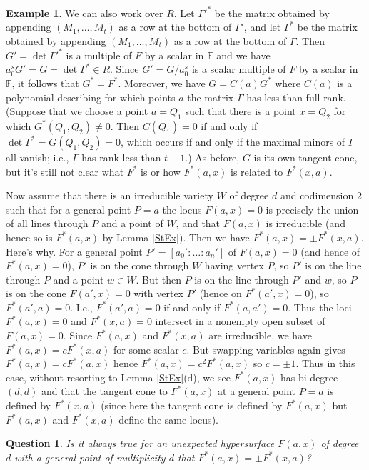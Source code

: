 \documentclass[12pt]{amsart}
\numberwithin{equation}{section}
\newtheorem{question}[theorem]{Question}
\theoremstyle{definition}
\newtheorem{example}[theorem]{Example}
\newcommand{\FF}{ \ensuremath{\mathbb{F}}}
\begin{document}
\begin{example}
We can also work over $R$.
Let $\Gamma'^*$ be the matrix obtained by appending $(M_1,\ldots,M_t)$ as a row at the bottom of $\Gamma'$,
and let $\Gamma^*$ be the matrix obtained by appending $(M_1,\ldots,M_t)$ as a row at the bottom of $\Gamma$.
Then $G'=\det\Gamma'^*$ is a multiple of $F$ by a scalar in $\FF$ and we have $a_0^sG'=G=\det \Gamma^*\in R$.
Since $G'=G/a_0^s$ is a scalar multiple of $F$ by a scalar in $\FF$, it follows that $G^*=F^*$. 
Moreover, we have $G=C(a)G^*$
where $C(a)$ is a polynomial describing for which points $a$ the matrix $\Gamma$ has less than full rank.
(Suppose that we choose a point $a=Q_1$ such that there is a point $x=Q_2$ for which 
$G^*(Q_1,Q_2)\neq0$. Then $C(Q_1)=0$ if and only if $\det \Gamma^*=G(Q_1,Q_2)=0$,
which occurs if and only if the maximal minors of $\Gamma$ all vanish; i.e., $\Gamma$ has rank less than $t-1$.)
As before, $G$ is its own tangent cone, but it's still not clear what $F^*$ is or how $F^*(a,x)$ is related to $F^*(x,a)$. 

Now assume that there is an irreducible variety $W$ of degree $d$ and codimension 2 such that for a general point 
$P=a$ the locus $F(a,x)=0$ is precisely the union of all lines through $P$ and a point of $W$,
and that $F(a,x)$ is irreducible (and hence so is $F^*(a,x)$ by Lemma \ref{StEx}). Then we have $F^*(a,x)=\pm F^*(x,a)$. Here's why.
For a general point $P'=[a_0':\ldots:a_n']$ of $F(a,x)=0$ (and hence of $F^*(a,x)=0$), $P'$ is on the cone through $W$ having vertex $P$,
so $P'$ is on the line through $P$ and a point $w\in W$. But then $P$ is on the line through $P'$ and $w$, so
$P$ is on the cone $F(a',x)=0$ with vertex $P'$ (hence on $F^*(a',x)=0$), so $F^*(a',a)=0$. I.e., $F^*(a',a)=0$ if and only if $F^*(a,a')=0$.
Thus the loci $F^*(a,x)=0$ and $F^*(x,a)=0$ intersect in a nonempty open subset of $F(a,x)=0$. 
Since $F^*(a,x)$ and $F^*(x,a)$ are irreducible, we have $F^*(a,x)=cF^*(x,a)$ for some scalar $c$.
But swapping variables again gives $F^*(a,x)=cF^*(a,x)$ hence $F^*(a,x)=c^2F^*(a,x)$ so $c=\pm1$.
Thus in this case, without resorting to Lemma \ref{StEx}(d), we see $F^*(a,x)$ has bi-degree $(d,d)$
and that the tangent cone to $F^*(a,x)$ at a general point $P=a$ is defined by $F^*(x,a)$
(since here the tangent cone is defined by $F^*(a,x)$ but $F^*(a,x)$ and $F^*(x,a)$ define the same locus).
\end{example}

\begin{question} 
Is it always true for an unexpected hypersurface $F(a,x)$ of degree $d$ with a general point of multiplicity $d$ that $F^*(a,x)=\pm F^*(x,a)$?
\end{question} 
\end{document}
